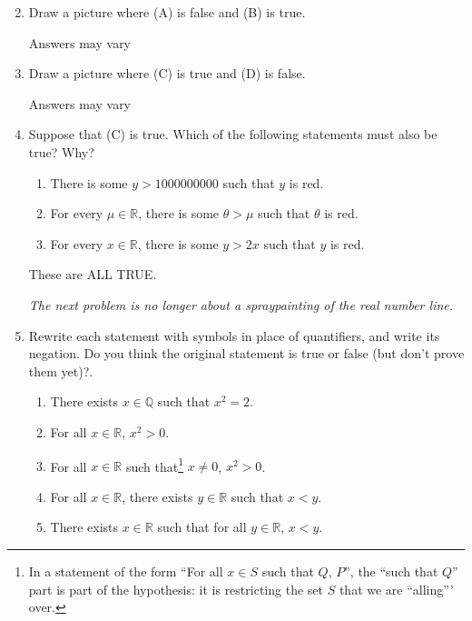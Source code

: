 \documentclass[12pt]{amsart}
\newcommand{\Q}{\mathbb{Q}}
\newcommand{\R}{{\mathbb{R}}}
\numberwithin{equation}{section}
\theoremstyle{plain} %
\theoremstyle{definition}
\theoremstyle{remark}
\begin{document}
\begin{enumerate}\setcounter{enumi}{1}

\item Draw a picture where (A) is false and (B) is true.

\begin{framed}
Answers may vary
\end{framed}

\item Draw a picture where (C) is true and (D) is false. 

\begin{framed}
Answers may vary
\end{framed}

\item Suppose that (C) is true. Which of the following statements must also be true? Why?

\begin{enumerate}
\item There is some $y>1000000000$ such that $y$ is red.
\item For every $\mu \in \R$, there is some $\theta>\mu$ such that $\theta$ is red.
\item For every $x\in \R$, there is some $y>2x$ such that $y$ is red.
\end{enumerate}

\begin{framed}
These are ALL TRUE.
\end{framed}

\noindent \emph{The next problem is no longer about a spraypainting of the real number line.}

\item\label{w2prob3} Rewrite each statement with symbols in place of quantifiers, and write its negation. Do you think the original statement is true or false (but don't prove them yet)?.
\begin{enumerate}
\item There exists $x\in \Q$ such that $x^2 = 2$.
\item For all $x\in \R$,  $x^2 >0$.
\item For all $x\in \R$ such that\footnote{In a statement of the form ``For all $x\in S$ such that $Q$, $P$'', the ``such that $Q$'' part is part of the hypothesis: it is restricting the set $S$ that we are ``alling''' over.} $x\neq 0$,  $x^2 >0$.
\item For all $x\in \R$, there exists $y\in \R$ such that $x<y$.
\item There exists $x\in \R$ such that for all $y\in \R$, $x<y$.
\end{enumerate}



\end{enumerate}
\end{document}
